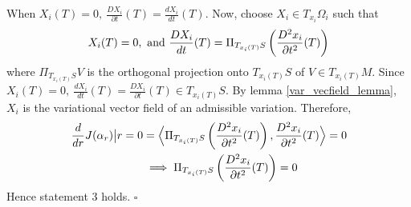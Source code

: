 \documentclass[letterpaper, 10 pt, conference]{ieeeconf}  %
\begin{document}
When $X_i(T) = 0, \ \frac{DX_i}{\partial t}(T) = \frac{dX_i}{dt}(T)$. Now, choose $X_i \in T_{x_i}\Omega_i$ such that
\begin{equation*}
\begin{split}
X_i(T) = 0, \hbox{ and } \frac{DX_i}{dt}(T) = \Pi_{T_{x_i(T)}S}\left(\frac{D^2x_i}{\partial t^2}(T)\right)
\end{split}
\end{equation*}
where $ \Pi_{T_{x_i(T)}S}V$ is the orthogonal projection onto $T_{x_i(T)}S$ of $V \in T_{x_i(T)}M$. Since
 $X_i(T) = 0,\ \frac{dX_i}{dt}(T) = \frac{DX_i}{\partial t}(T) \in T_{x_i(T)}S$. By lemma \ref{var_vecfield_lemma}, $X_i$ is the variational vector field of an admissible variation. Therefore,
\begin{equation*}
\begin{split}
\frac{d}{dr}J(\alpha_r)\big{|}{r=0} & = \Big \langle  \Pi_{T_{x_i(T)}S}\left(\frac{D^2x_i}{\partial t^2}(T)\right), \frac{D^2x_i}{\partial t^2}(T) \Big \rangle = 0 \\
&\implies \Pi_{T_{x_i(T)}S}\left(\frac{D^2x_i}{\partial t^2}(T)\right) = 0
\end{split}
\end{equation*}
Hence statement 3 holds. \hfill$\square$
\iffalse
If $\Gamma^{k}_{ij}(x) = 0 \ \forall x \in S$, then $\frac{DX_i}{\partial t}(T) = \frac{dX_i}{dt}(T)$. Choose $X_i \in T_{x_i}\Omega_i$ such that \\
\begin{equation*}
\begin{split}
X_i(T) = \Pi_{T_{x_i(T)}S}(\frac{D^3x_i}{dt^3} - k\frac{dx_i}{dt}) \qquad  \frac{DX_i}{dt}(T) = \Pi_{T_{x_i(T)}S}(\frac{D^2x_i}{\partial t^2}(T))
\end{split}
\end{equation*}
Therefore
\begin{equation*}
\begin{split}
\at{\frac{d}{dr}J(\alpha_r)}{r=0} & = \Big \langle  \Pi_{T_{x_i(T)}S}(\frac{D^3x_i}{dt^3} - k\frac{dx_i}{dt}), \frac{D^3x_i}{dt^3} - k\frac{dx_i}{dt} \Big \rangle = 0 \\
&\implies \Pi_{T_{x_i(T)}S}(\frac{D^3x_i}{dt^3} - k\frac{dx_i}{dt}) = 0
\end{split}
\end{equation*}
Hence, 3.2 (iv) follows.
\fi
\end{document}
